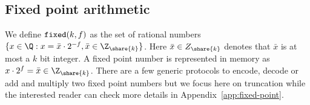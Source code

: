 \subsection{Fixed point arithmetic}
\label{subsec:fixed-point}


We define $\verb|fixed|(k, f)$ as the set of rational numbers $\{x \in \Q : x
= \bar{x} \cdot 2^{-f}, \bar{x} \in \Z_{\share{k}}\}$. Here $\bar{x} \in
Z_{\share{k}}$ denotes that $\bar{x}$ is at most a $k$ bit integer. A fixed
point number is represented in memory as $x \cdot 2^{f} = \bar{x} \in
\Z_{\share{k}}$. There are a few generic protocols to encode, decode or add
and multiply two fixed point numbers but we focus here on truncation while
the interested reader can check more details in
Appendix~\ref{app:fixed-point}.


